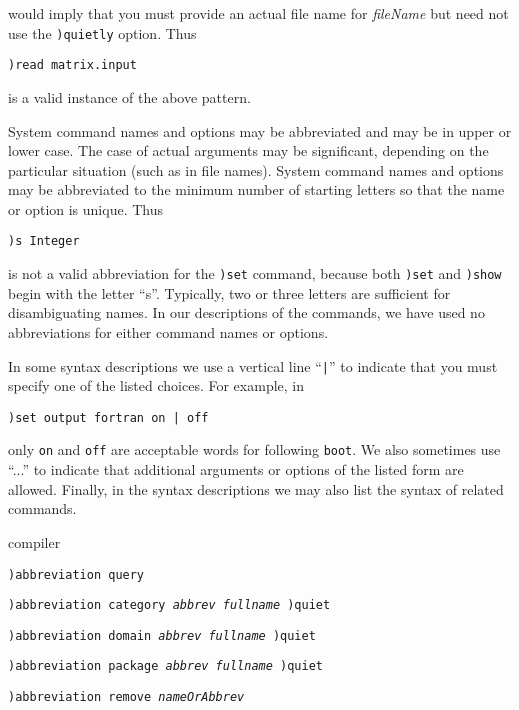 \noindent
would imply that you must provide an actual file name for
{\it fileName} but need not use the {\tt )quietly} option.
Thus
\begin{verbatim}
)read matrix.input
\end{verbatim}
is a valid instance of the above pattern.

System command names and options may be abbreviated and may be in
upper or lower case.
The case of actual arguments may be significant, depending on the
particular situation (such as in file names).
System command names and options may be abbreviated to the minimum
number of starting letters so that the name or option is unique.
Thus
\begin{verbatim}
)s Integer
\end{verbatim}
is not a valid abbreviation for the {\tt )set} command,
because both {\tt )set} and {\tt )show}
begin with the letter ``s''.
Typically, two or three letters are sufficient for disambiguating names.
In our descriptions of the commands, we have used no abbreviations for
either command names or options.

In some syntax descriptions we use a vertical line ``{\tt |}''
to indicate that you must specify one of the listed choices.
For example, in
\begin{verbatim}
)set output fortran on | off
\end{verbatim}
only {\tt on} and {\tt off} are acceptable words for following
{\tt boot}.
We also sometimes use ``...'' to indicate that additional arguments
or options of the listed form are allowed.
Finally, in the syntax descriptions we may also list the syntax of
related commands.



\par{} compiler

\par{}
\begin{simpleList}
\item {\tt )abbreviation query  \ranb{}}
\item {\tt )abbreviation category  {\it abbrev  fullname} \lanb{})quiet\ranb{}}
\item {\tt )abbreviation domain  {\it abbrev  fullname}   \lanb{})quiet\ranb{}}
\item {\tt )abbreviation package  {\it abbrev  fullname}  \lanb{})quiet\ranb{}}
\item {\tt )abbreviation remove  {\it nameOrAbbrev}}
\end{simpleList}

